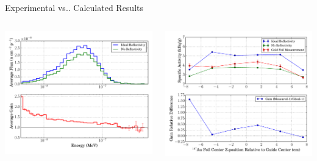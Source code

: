 \documentclass[final,t]{beamer}
\makeatletter
\DeclareRobustCommand\onedot{\futurelet\@let@token\@onedot}
\def\@onedot{\ifx\@let@token.\else.\null\fi\xspace}
\def\vs{{vs}\onedot}
\makeatother
\begin{document}
\begin{frame}{}
\begin{columns}[t]
\begin{column}{.3\linewidth}
      \vspace{8ex}
      \begin{block}{Experimental \vs Calculated Results}

      \begin{columns}

      \begin{column}{0.5\linewidth}
      \vspace{-4ex}
      \begin{center}
      \includegraphics*[width=\linewidth]{gain.pdf}
      \end{center}
      \end{column}
      \begin{column}{0.5\linewidth}
      \vspace{-4ex}
      \begin{center}
      \includegraphics*[width=\linewidth]{GF_act.pdf}

\end{center}
\end{column}
\end{columns}
\end{block}
\end{column}
\end{columns}
\end{frame}
\end{document}

